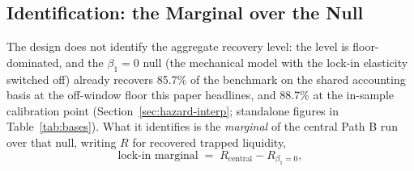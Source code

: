 \documentclass[12pt]{article}
\begin{document}
\subsection{Identification: the Marginal over the Null}\label{sec:identification}

The design does not identify the aggregate recovery level: the level is floor-dominated, and the $\beta_1 = 0$ null (the mechanical model with the lock-in elasticity switched off) already recovers 85.7\% of the benchmark on the shared accounting basis at the off-window floor this paper headlines, and 88.7\% at the in-sample calibration point (Section~\ref{sec:hazard-interp}; standalone figures in Table~\ref{tab:bases}). What it identifies is the \emph{marginal} of the central Path B run over that null, writing $R$ for recovered trapped liquidity,
\begin{equation}\label{eq:marginal}
\text{lock-in marginal} \;=\; R_{\text{central}} - R_{\beta_1 = 0},
\end{equation}
\end{document}

